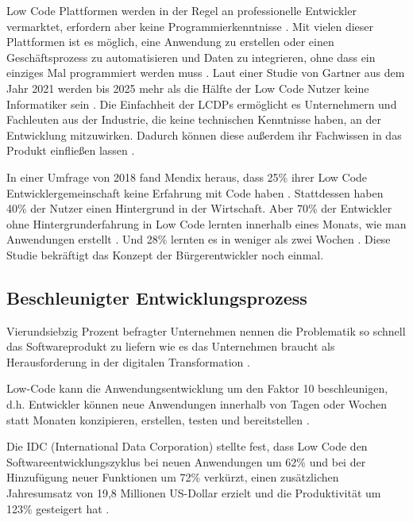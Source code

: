 \documentclass[12pt]{article} %
\begin{document}
	Low Code Plattformen werden in der Regel an professionelle Entwickler vermarktet, erfordern aber keine Programmierkenntnisse \autocite{MichelleGardner.2022}. Mit vielen dieser Plattformen ist es möglich, eine Anwendung zu erstellen oder einen Geschäftsprozess zu automatisieren und Daten zu integrieren, ohne dass ein einziges Mal programmiert werden muss \autocite{MichelleGardner.2022}. Laut einer Studie von Gartner aus dem Jahr 2021 werden bis 2025 mehr als die Hälfte der Low Code Nutzer keine Informatiker sein \autocite{OleksiiGlib.2022}. Die Einfachheit der LCDPs ermöglicht es Unternehmern und Fachleuten aus der Industrie, die keine technischen Kenntnisse haben, an der Entwicklung mitzuwirken. Dadurch können diese außerdem ihr Fachwissen in das Produkt einfließen lassen \autocite{OleksiiGlib.2022}. \newline
	
	In einer Umfrage von 2018 fand Mendix heraus, dass 25\% ihrer Low Code Entwicklergemeinschaft keine Erfahrung mit Code haben \autocite{KevinShuler.2023}. Stattdessen haben 40\% der Nutzer einen Hintergrund in der Wirtschaft. Aber 70\% der Entwickler ohne Hintergrunderfahrung in Low Code lernten innerhalb eines Monats, wie man Anwendungen erstellt \autocite{KevinShuler.2023}. Und 28\% lernten es in weniger als zwei Wochen \autocite{KevinShuler.2023}. Diese Studie bekräftigt das Konzept der Bürgerentwickler noch einmal.
	
	\subsection{Beschleunigter Entwicklungsprozess}	\label{faster}
	Vierundsiebzig Prozent befragter Unternehmen nennen die Problematik so schnell das Softwareprodukt zu liefern wie es das Unternehmen braucht als Herausforderung in der digitalen Transformation \autocite{EmmaVanPelt.2019}. \newline %
	
	Low-Code kann die Anwendungsentwicklung um den Faktor 10 beschleunigen, d.h. Entwickler können neue Anwendungen innerhalb von Tagen oder Wochen statt Monaten konzipieren, erstellen, testen und bereitstellen \autocite{KevinShuler.2023}. \newline
	
	Die IDC (International Data Corporation) stellte fest, dass Low Code den Softwareentwicklungszyklus bei neuen Anwendungen um 62\% und bei der Hinzufügung neuer Funktionen um 72\% verkürzt, einen zusätzlichen Jahresumsatz von 19,8 Millionen US-Dollar erzielt und die Produktivität um 123\% gesteigert hat \autocite{KevinShuler.2023}.
	
\end{document}

